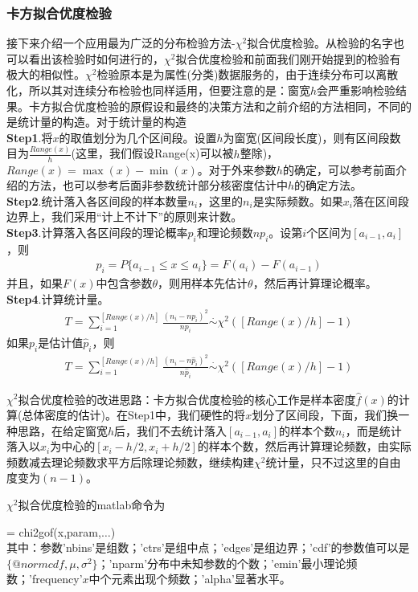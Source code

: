        \subsubsection{卡方拟合优度检验}
            \par
            接下来介绍一个应用最为广泛的分布检验方法-$\chi^2$拟合优度检验。从检验的名字也可以看出该检验时如何进行的，$\chi^2$拟合优度检验和前面我们刚开始提到的检验有极大的相似性。$\chi^2$检验原本是为属性(分类)数据服务的，由于连续分布可以离散化，所以其对连续分布检验也同样适用，但要注意的是：窗宽$h$会严重影响检验结果。卡方拟合优度检验的原假设和最终的决策方法和之前介绍的方法相同，不同的是统计量的构造。对于统计量的构造\\
            \textbf{Step1}.将$x$的取值划分为几个区间段。设置$h$为窗宽(区间段长度)，则有区间段数目为$\frac{Range(x)}{h}$(这里，我们假设Range(x)可以被$h$整除)，$Range(x) = \max(x) - \min(x)$。对于外来参数$h$的确定，可以参考前面介绍的方法，也可以参考后面非参数统计部分核密度估计中$h$的确定方法。\\
            \textbf{Step2}.统计落入各区间段的样本数量$n_i$，这里的$n_i$是实际频数。如果$x_i$落在区间段边界上，我们采用“计上不计下”的原则来计数。\\
            \textbf{Step3}.计算落入各区间段的理论概率$p_i$和理论频数$np_i$。设第$i$个区间为$[a_{i-1},a_i]$，则
            \begin{align*}
            p_i = P\{a_{i-1} \leqslant x \leqslant a_i\} = F(a_i) - F(a_{i-1})
            \end{align*}
            并且，如果$F(x)$中包含参数$\theta$，则用样本先估计$\theta$，然后再计算理论概率。\\
            \textbf{Step4}.计算统计量。
            \begin{align*}
            T = \sum_{i=1}^{[Range(x)/h]} \frac{(n_i - np_i)^2}{np_i} \overset{\cdot}{\sim} \chi^2([Range(x)/h] - 1)
            \end{align*}
            如果$p_i$是估计值$\hat{p}_i$，则
            \begin{align*}
            T = \sum_{i=1}^{[Range(x)/h]} \frac{(n_i - n\hat{p}_i)^2}{n\hat{p}_i} \overset{\cdot}{\sim} \chi^2([Range(x)/h] - 1)
            \end{align*}
            \par
            $\chi^2$拟合优度检验的改进思路：卡方拟合优度检验的核心工作是样本密度$\hat{f}(x)$的计算(总体密度的估计)。在Step1中，我们硬性的将$x$划分了区间段，下面，我们换一种思路，在给定窗宽$h$后，我们不去统计落入$[a_{i-1},a_i]$的样本个数$n_i$，而是统计落入以$x_i$为中心的$[x_i-h/2,x_i+h/2]$的样本个数，然后再计算理论频数，由实际频数减去理论频数求平方后除理论频数，继续构建$\chi^2$统计量，只不过这里的自由度变为$(n-1)$。
            \par
            $\chi^2$拟合优度检验的matlab命令为
            \par
            [h,p,stats] = chi2gof(x,param,$\dots$)\\
            其中：参数'nbins'是组数；'ctrs'是组中点；'edges'是组边界；'cdf'的参数值可以是$\{@ normcdf,\mu,\sigma^2\}$；'nparm'分布中未知参数的个数；'emin'最小理论频数；'frequency'$x$中个元素出现个频数；'alpha'显著水平。
